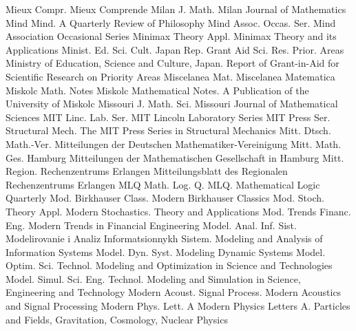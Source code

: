 {Mieux Compr.}
{Mieux Comprende}
{Milan J. Math.}
{Milan Journal of Mathematics}
{Mind}
{Mind. A Quarterly Review of Philosophy}
{Mind Assoc. Occas. Ser.}
{Mind Association Occasional Series}
{Minimax Theory Appl.}
{Minimax Theory and its Applications}
{Minist. Ed. Sci. Cult. Japan Rep. Grant Aid Sci. Res. Prior. Areas}
{Ministry of Education, Science and Culture, Japan. Report of Grant-in-Aid for Scientific Research on Priority Areas}
{Miscelanea Mat.}
{Miscelanea Matematica}
{Miskolc Math. Notes}
{Miskolc Mathematical Notes. A Publication of the University of Miskolc}
{Missouri J. Math. Sci.}
{Missouri Journal of Mathematical Sciences}
{MIT Linc. Lab. Ser.}
{MIT Lincoln Laboratory Series}
{MIT Press Ser. Structural Mech.}
{The MIT Press Series in Structural Mechanics}
{Mitt. Dtsch. Math.-Ver.}
{Mitteilungen der Deutschen Mathematiker-Vereinigung}
{Mitt. Math. Ges. Hamburg}
{Mitteilungen der Mathematischen Gesellschaft in Hamburg}
{Mitt. Region. Rechenzentrums Erlangen}
{Mitteilungsblatt des Regionalen Rechenzentrums Erlangen}
{MLQ Math. Log. Q.}
{MLQ. Mathematical Logic Quarterly}
{Mod. Birkhauser Class.}
{Modern Birkhauser Classics}
{Mod. Stoch. Theory Appl.}
{Modern Stochastics. Theory and Applications}
{Mod. Trends Financ. Eng.}
{Modern Trends in Financial Engineering}
{Model. Anal. Inf. Sist.}
{Modelirovanie i Analiz Informatsionnykh Sistem. Modeling and Analysis of Information Systems}
{Model. Dyn. Syst.}
{Modeling Dynamic Systems}
{Model. Optim. Sci. Technol.}
{Modeling and Optimization in Science and Technologies}
{Model. Simul. Sci. Eng. Technol.}
{Modeling and Simulation in Science, Engineering and Technology}
{Modern Acoust. Signal Process.}
{Modern Acoustics and Signal Processing}
{Modern Phys. Lett. A}
{Modern Physics Letters A. Particles and Fields, Gravitation, Cosmology, Nuclear Physics}
